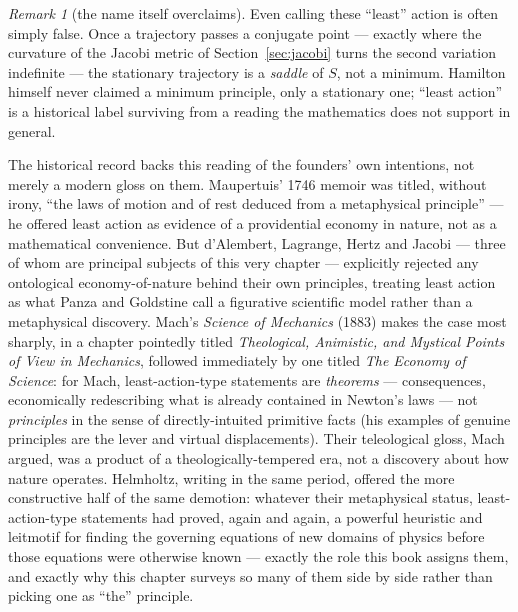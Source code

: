 \documentclass[11pt]{book}
\theoremstyle{definition}
\theoremstyle{plain}
\theoremstyle{remark}
\newtheorem{remark}[definition]{Remark}
\begin{document}
\begin{remark}[the name itself overclaims]
Even calling these ``least'' action is often simply false. Once a trajectory passes a conjugate point --- exactly where the curvature of the Jacobi metric of Section~\ref{sec:jacobi} turns the second variation indefinite --- the stationary trajectory is a \emph{saddle} of $S$, not a minimum. Hamilton himself never claimed a minimum principle, only a stationary one; ``least action'' is a historical label surviving from a reading the mathematics does not support in general.
\end{remark}

The historical record backs this reading of the founders' own intentions, not merely a modern gloss on them. Maupertuis' 1746 memoir was titled, without irony, ``the laws of motion and of rest deduced from a metaphysical principle'' --- he offered least action as evidence of a providential economy in nature, not as a mathematical convenience. But d'Alembert, Lagrange, Hertz and Jacobi --- three of whom are principal subjects of this very chapter --- explicitly rejected any ontological economy-of-nature behind their own principles, treating least action as what Panza and Goldstine call a figurative scientific model rather than a metaphysical discovery. Mach's \emph{Science of Mechanics} (1883) makes the case most sharply, in a chapter pointedly titled \emph{Theological, Animistic, and Mystical Points of View in Mechanics}, followed immediately by one titled \emph{The Economy of Science}: for Mach, least-action-type statements are \emph{theorems} --- consequences, economically redescribing what is already contained in Newton's laws --- not \emph{principles} in the sense of directly-intuited primitive facts (his examples of genuine principles are the lever and virtual displacements). Their teleological gloss, Mach argued, was a product of a theologically-tempered era, not a discovery about how nature operates. Helmholtz, writing in the same period, offered the more constructive half of the same demotion: whatever their metaphysical status, least-action-type statements had proved, again and again, a powerful heuristic and leitmotif for finding the governing equations of new domains of physics before those equations were otherwise known --- exactly the role this book assigns them, and exactly why this chapter surveys so many of them side by side rather than picking one as ``the'' principle.
\end{document}
